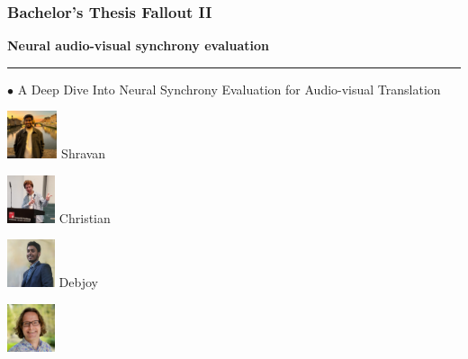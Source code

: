 \documentclass[aspectratio=169]{beamer}
\begin{document}
\begin{frame}[fragile]
	\frametitle{Bachelor's Thesis Fallout II}
    \begin{minipage}{1.0\textwidth}
        \begin{minipage}{.55\textwidth}
            \textbf{Neural audio-visual synchrony evaluation}
            \par\noindent\rule{\textwidth}{0.4pt}
            {\color{thiscolor}$\bullet$} A Deep Dive Into Neural Synchrony Evaluation for Audio-visual Translation
            \\ \citep{nayak2022DeepDiveNeural}
        \end{minipage}
        \begin{minipage}{.44\textwidth}
            \centering
            \begin{minipage}{.24\textwidth}
                \centering
                \includegraphics[height=1.4cm]{images/Shravan_Nayak.jpg} 
                Shravan
            \end{minipage}%
            \begin{minipage}{.24\textwidth}
                \centering
                \includegraphics[height=1.4cm]{images/Christian_Schuler_Lecture.jpg}
                Christian
            \end{minipage}%
            \begin{minipage}{.24\textwidth}
                \centering
                \includegraphics[height=1.4cm]{images/Debjoy_Saha.png}
                Debjoy
            \end{minipage}%
            \begin{minipage}{.24\textwidth}
                \centering
                \includegraphics[height=1.4cm]{images/Timo_Baumann.jpg}

\end{minipage}
\end{minipage}
\end{minipage}
\end{frame}
\end{document}
